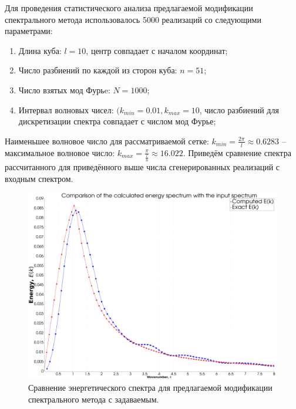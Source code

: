 Для проведения статистического анализа предлагаемой модификации спектрального метода использовалось 5000 реализаций со следующими параметрами:
\begin{enumerate}
    \item Длина куба: $l = 10$, центр совпадает с началом координат;
    \item Число разбиений по каждой из сторон куба: $n = 51$;
    \item Число взятых мод Фурьe: $N = 1000$;
    \item Интервал волновых чисел: $(k_{min} = 0.01, k_{max} = 10$, число разбиений для дискретизации спектра совпадает с числом мод Фурье;
\end{enumerate}

Наименьшее волновое число для рассматриваемой сетке: $k_{min} = \frac{2 \pi}{l} \approx 0.6283$ -- максимальное волновое число: $k_{max} = \frac{\pi}{\frac{l}{n}} \approx 16.022$. Приведём сравнение спектра рассчитанного для приведённого выше числа сгенерированных реализаций с входным спектром.

\begin{figure}[ht] 
    \center
    \includegraphics [width=0.8\linewidth] {images/spectral/spectra_l10_k10_f1000_n51.png}
    \caption{Сравнение энергетического спектра для предлагаемой модификации спектрального метода с задаваемым.} 
    \label{img:spectral_desam_spectra_comarison}  
\end{figure}

